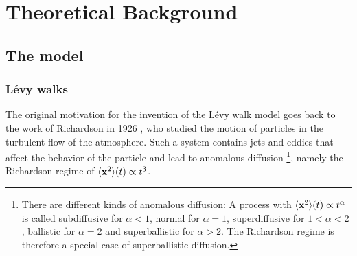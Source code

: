 \chapter{Theoretical Background}

\section{The model}

\subsection{L\'evy walks}

The original motivation for the invention of the L\'evy walk model goes back to the work of Richardson in 1926 
\cite{richardson},
 who studied the motion of particles in the turbulent flow of the atmosphere. Such a system contains jets and eddies that affect the behavior of the particle and lead to anomalous diffusion
\footnote{There are different kinds of anomalous diffusion: A process with $\langle \mathbf{ x }^2 \rangle(t) \propto t^{\alpha}$ is called subdiffusive for $\alpha<1$, normal for $\alpha = 1$, superdiffusive for $1<\alpha<2$, ballistic for $\alpha=2$ and superballistic for $\alpha > 2 $. The Richardson regime is therefore a special case of superballistic diffusion.}, 
namely the Richardson regime of $\langle \mathbf{ x }^2 \rangle(t) \propto t^3 $.

